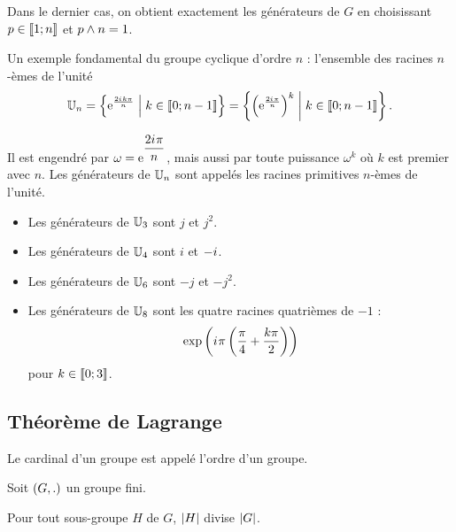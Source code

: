 Dans le dernier cas, on obtient exactement les générateurs de \(G\) en choisissant \(p\in\left\llbracket1;n\right\rrbracket\) et \(p\land n=1\).

Un exemple fondamental du groupe cyclique d'ordre \(n\) : l'ensemble des racines \(n\)-èmes de l'unité \[\mathbb{U}_n=\left\lbrace\mathrm{e}^{\frac{2i\mkern1mu k\pi}{n}}\;\middle|\; k\in\left\llbracket0;n-1\right\rrbracket\right\rbrace=\left\lbrace\left(\mathrm{e}^{\frac{2i\mkern1mu\pi}{n}}\right)^k\;\middle|\; k\in\left\llbracket0;n-1\right\rrbracket\right\rbrace.\]

Il est engendré par \(\omega=\mathrm{e}^{\dfrac{2i\mkern1mu\pi}{n}}\), mais aussi par toute puissance \(\omega^k\) où \(k\) est premier avec \(n\). Les générateurs de \(\mathbb{U}_n\) sont appelés les racines primitives \(n\)-èmes de l'unité.

\begin{ex}
\begin{itemize}
    \item Les générateurs de \(\mathbb{U}_3\) sont \(j\) et \(j^2\). \\
    \item Les générateurs de \(\mathbb{U}_4\) sont \(i\) et \(-i\mkern1mu\). \\
    \item Les générateurs de \(\mathbb{U}_6\) sont \(-j\) et \(-j^2\). \\
    \item Les générateurs de \(\mathbb{U}_8\) sont les quatre racines quatrièmes de \(-1\) : \[\exp\left(i\mkern1mu\pi\left(\dfrac{\pi}{4}+\dfrac{k\pi}{2}\right)\right)\] pour \(k\in\left\llbracket0;3\right\rrbracket\).
\end{itemize}
\end{ex}

\subsection{Théorème de Lagrange}

\begin{defi}
Le cardinal d'un groupe est appelé l'ordre d'un groupe.
\end{defi}

\begin{theo}
Soit \(\groupe{G}[.]\) un groupe fini.

Pour tout sous-groupe \(H\) de \(G\), \(\left\lvert H\right\rvert\) divise \(\left\lvert G\right\rvert\).
\end{theo}

